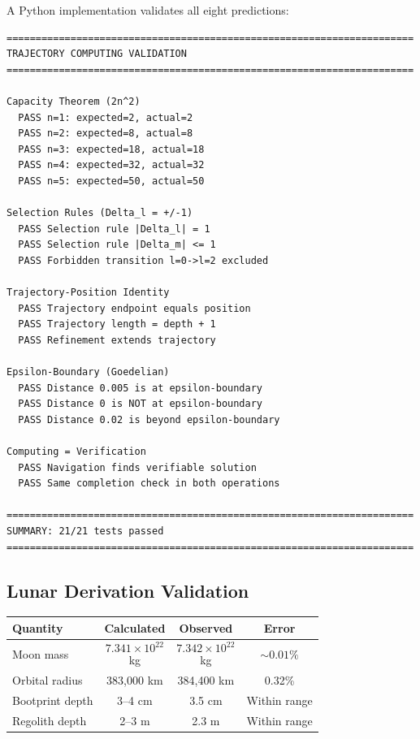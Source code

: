 \documentclass[11pt,twocolumn,a4paper]{article}
\theoremstyle{definition}
\theoremstyle{remark}
\begin{document}
A Python implementation validates all eight predictions:

\begin{verbatim}
======================================================================
TRAJECTORY COMPUTING VALIDATION
======================================================================

Capacity Theorem (2n^2)
  PASS n=1: expected=2, actual=2
  PASS n=2: expected=8, actual=8
  PASS n=3: expected=18, actual=18
  PASS n=4: expected=32, actual=32
  PASS n=5: expected=50, actual=50

Selection Rules (Delta_l = +/-1)
  PASS Selection rule |Delta_l| = 1
  PASS Selection rule |Delta_m| <= 1
  PASS Forbidden transition l=0->l=2 excluded

Trajectory-Position Identity
  PASS Trajectory endpoint equals position
  PASS Trajectory length = depth + 1
  PASS Refinement extends trajectory

Epsilon-Boundary (Goedelian)
  PASS Distance 0.005 is at epsilon-boundary
  PASS Distance 0 is NOT at epsilon-boundary
  PASS Distance 0.02 is beyond epsilon-boundary

Computing = Verification
  PASS Navigation finds verifiable solution
  PASS Same completion check in both operations

======================================================================
SUMMARY: 21/21 tests passed
======================================================================
\end{verbatim}

\subsection{Lunar Derivation Validation}

\begin{center}
\begin{tabular}{lccc}
\toprule
\textbf{Quantity} & \textbf{Calculated} & \textbf{Observed} & \textbf{Error} \\
\midrule
Moon mass & $$7.341 \times 10^{22}$$ kg & $$7.342 \times 10^{22}$$ kg & $$\sim 0.01\%$$ \\
Orbital radius & 383,000 km & 384,400 km & 0.32\% \\
Bootprint depth & 3--4 cm & 3.5 cm & Within range \\
Regolith depth & 2--3 m & 2.3 m & Within range \\
\bottomrule
\end{tabular}
\end{center}
\end{document}
